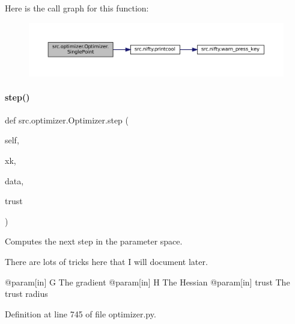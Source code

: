 Here is the call graph for this function\+:
\nopagebreak
\begin{figure}[H]
\begin{center}
\leavevmode
\includegraphics[width=350pt]{classsrc_1_1optimizer_1_1Optimizer_afe5c560532731458954ae6e9093b8376_cgraph}
\end{center}
\end{figure}
\mbox{\label{classsrc_1_1optimizer_1_1Optimizer_ad8a296a7a624707234b4c9fc949c5dbd}} 
\paragraph{\texorpdfstring{step()}{step()}}
{\footnotesize\ttfamily def src.\+optimizer.\+Optimizer.\+step (\begin{DoxyParamCaption}\item[{}]{self,  }\item[{}]{xk,  }\item[{}]{data,  }\item[{}]{trust }\end{DoxyParamCaption})}



Computes the next step in the parameter space. 

There are lots of tricks here that I will document later. \begin{DoxyVerb}   @param[in] G The gradient
   @param[in] H The Hessian
   @param[in] trust The trust radius\end{DoxyVerb}
 

Definition at line 745 of file optimizer.\+py.

